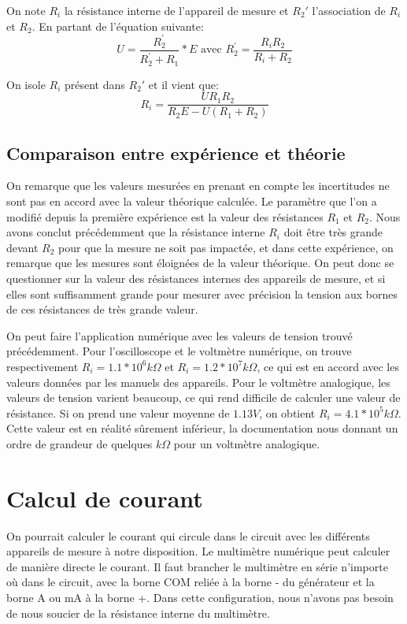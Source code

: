 \documentclass[10pt]{article}
\begin{document}
On note $R_i$ la résistance interne de l'appareil de mesure et $R_2'$ l'association de $R_i$ et $R_2$. En partant de l'équation suivante:
\begin{equation}
    U = \frac{R_2^{'}}{R_2^{'} + R_1} * E \text{ avec } R_2^{'} = \frac{R_iR_2}{R_i + R_2}
\end{equation}

On isole $R_i$ présent dans $R_2'$ et il vient que:
\begin{equation}
    R_i = \frac{U R_1 R_2}{R_2 E - U (R_1 + R_2)}
\end{equation}

\subsection{Comparaison entre expérience et théorie}


	On remarque que les valeurs mesurées en prenant en compte les incertitudes ne sont pas en accord avec la valeur théorique calculée.
Le paramètre que l'on a modifié depuis la première expérience est la valeur des résistances $R_1$ et $R_2$. 
Nous avons conclut précédemment que la résistance interne $R_i$ doit être très grande devant $R_2$ pour que la mesure ne soit pas impactée,
et dans cette expérience, on remarque que les mesures sont éloignées de la valeur théorique. 
On peut donc se questionner sur la valeur des résistances internes des appareils de mesure, et si elles sont suffisamment grande
pour mesurer avec précision la tension aux bornes de ces résistances de très grande valeur.


On peut faire l'application numérique avec les valeurs de tension trouvé précédemment. Pour l'oscilloscope et le voltmètre numérique, on trouve respectivement $R_i = 1.1*10^{6} k\Omega$ et $R_i = 1.2*10^{7} k\Omega$, ce qui est en accord avec les valeurs données par les manuels des appareils. Pour le voltmètre analogique, les valeurs de tension varient beaucoup, ce qui rend difficile de calculer une valeur de résistance. Si on prend une valeur moyenne de $1.13V$, on obtient $R_i= 4.1*10^{5} k\Omega$. Cette valeur est en réalité sûrement inférieur, la documentation nous donnant un ordre de grandeur de quelques $k\Omega$ pour un voltmètre analogique. 
\section{Calcul de courant}


	On pourrait calculer le courant qui circule dans le circuit avec les différents appareils de mesure à notre disposition. Le multimètre numérique peut calculer de manière directe le courant. Il faut brancher le multimètre en série n'importe où dans le circuit, avec la borne COM reliée  à la borne - du générateur et la borne A ou mA à la borne +. Dans cette configuration, nous n'avons pas besoin de nous soucier de la résistance interne du multimètre.
\end{document}
